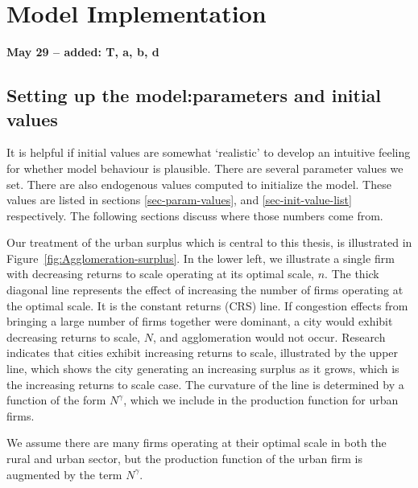 \chapter[Model Implementation]{Model Implementation}
\textbf{May 29 -- added: T, a, b, d}
\section{Setting up the model:\newline parameters and initial values}
It is helpful if initial values are somewhat `realistic' to develop an intuitive feeling for whether model behaviour is plausible. 
There are several parameter values we set. There are also endogenous values computed to initialize the model. These values are listed in sections \ref{sec-param-values}, and \ref{sec-init-value-list} respectively. The following sections discuss where those numbers come from. %

Our treatment of the urban surplus which is central to this thesis, is illustrated in Figure~\ref{fig:Agglomeration-surplus}. In the lower left, we illustrate a single firm with decreasing returns to scale operating at its optimal scale, $n$. The thick diagonal line represents the effect of increasing the number of firms operating at the optimal scale. It is the constant returns (CRS) line. If congestion effects from bringing a large number of firms together were dominant, a city would exhibit decreasing returns to  scale,  $N$, and agglomeration would not occur. Research indicates that cities exhibit increasing returns to scale, illustrated by the upper line, which shows the city generating an increasing surplus as it grows, which is the increasing returns to scale case. The curvature of the line is determined by a function of the form $N^\gamma$, which we include in the production function for urban firms. 

We assume there are many firms operating at their optimal scale in both the rural and urban sector, but the production function of the urban firm is augmented by the term $N^\gamma$. 

